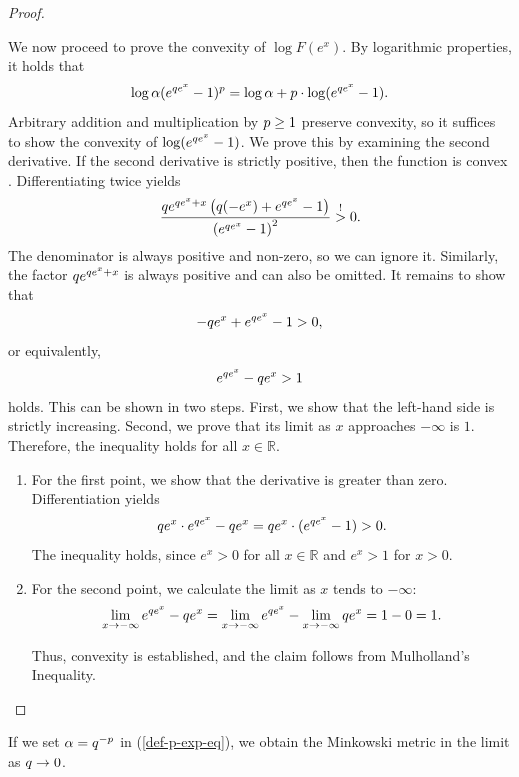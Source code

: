 \begin{proof}
\begin{proofpart}
		We now proceed to prove the convexity of $\log F(e^x)$.
		By logarithmic properties, it holds that
		$$ \log \alpha(e^{q e^x} -1)^p = \log \alpha + p \cdot  \log(e^{q e^x} - 1). $$
		Arbitrary addition and multiplication by $p \geq 1$ preserve convexity, so it suffices to show the convexity of $\log(e^{q e^x} - 1)$.
		We prove this by examining the second derivative. If the second derivative is strictly positive, then the function is convex \parencite[p. 57, Remark 2.13]{lecturesConvGeo}.
		Differentiating twice yields
		$$
			\frac{q  e^{q e^x + x} \left( q  (-e^x) + e^{q e^x} - 1 \right)}{\left( e^{q e^x} - 1 \right)^2} \overset{!}{>} 0.
		$$
		The denominator is always positive and non-zero, so we can ignore it. Similarly, the factor $q  e^{q e^x + x}$ is always positive and can also be omitted. It remains to show that
			$$-q  e^x + e^{q e^x} - 1 > 0,$$
    or equivalently, 
			$$e^{q e^x}  - q  e^x     > 1$$
		holds.
		This can be shown in two steps. First, we show that the left-hand side is strictly increasing. Second, we prove that its limit as $x$ approaches $-\infty$ is $1$.
		Therefore, the inequality holds for all $x \in \mathbb{R}$.

		\begin{enumerate}
			\item For the first point, we show that the derivative is greater than zero. Differentiation yields
			      $$ q e^x \cdot e^{q e^x} - q e^x = q e^x \cdot (e^{q e^x} - 1) > 0. $$ The inequality holds, since $e^x > 0$ for all $x \in \mathbb{R}$ and $e^x > 1$ for $x > 0$.
			\item For the second point, we calculate the limit as $x$ tends to $-\infty$:
			      $$ \lim_{x \rightarrow -\infty} e^{q e^x}  - q  e^x = \lim_{x \rightarrow -\infty} e^{q e^x}  - \lim_{x \rightarrow -\infty} q  e^x =  1 - 0 = 1. $$

			      Thus, convexity is established, and the claim follows from Mulholland's Inequality.
		\end{enumerate}
	\end{proofpart}
\end{proof}

\begin{rem} \label{rem-mink-pexp}
	If we set $\alpha = q ^{-p}$ in (\cref{def-p-exp-eq}), we obtain the Minkowski metric in the limit as $q  \rightarrow 0$.
\end{rem}

